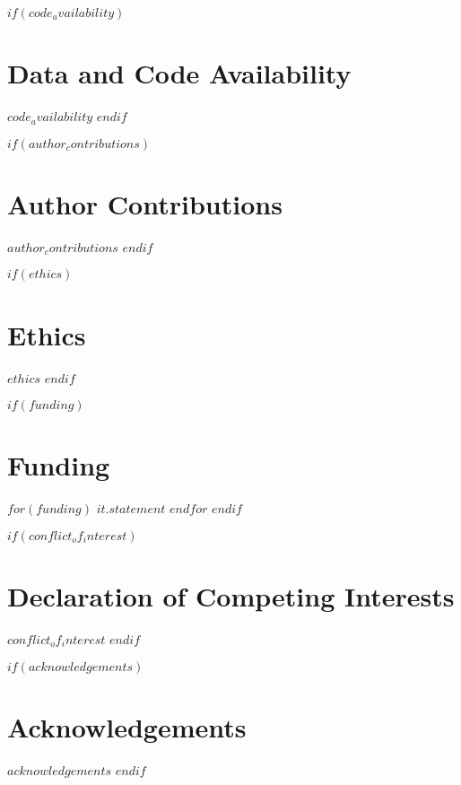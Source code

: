 $if(code_availability)$
\section*{Data and Code Availability}

$code_availability$
$endif$

$if(author_contributions)$
\section*{Author Contributions}

$author_contributions$
$endif$

$if(ethics)$
\section*{Ethics}

$ethics$
$endif$

$if(funding)$
\section*{Funding}

$for(funding)$
$it.statement$
$endfor$
$endif$

$if(conflict_of_interest)$
\section*{Declaration of Competing Interests}

$conflict_of_interest$
$endif$

$if(acknowledgements)$
\section*{Acknowledgements}

$acknowledgements$
$endif$
